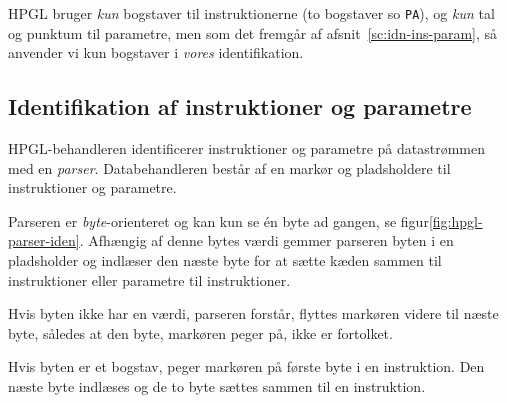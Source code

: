 HPGL bruger \textit{kun} bogstaver til instruktionerne (to bogstaver
so \texttt{PA}), og \textit{kun} tal og punktum til parametre, men som
det fremgår af afsnit~\vref{sc:idn-ins-param}, så anvender vi kun
bogstaver i \textit{vores} identifikation.  

\subsection{Identifikation af instruktioner og parametre}
\label{sc:idn-ins-param}


HPGL-behandleren identificerer instruktioner og parametre på
datastrømmen med en \textit{parser}. Databehandleren består af en
markør og pladsholdere til instruktioner og parametre.

Parseren er \textit{byte}-orienteret og kan kun se én byte ad gangen,
se figur\vref{fig:hpgl-parser-iden}. Afhængig af denne bytes værdi
gemmer parseren byten i en pladsholder og indlæser den næste byte for
at sætte kæden sammen til instruktioner eller parametre til
instruktioner.


Hvis byten ikke har en værdi, parseren forstår, flyttes markøren
videre til næste byte, således at den byte, markøren peger på, ikke er
fortolket.

Hvis byten er et bogstav, peger markøren på første byte i en
instruktion. Den næste byte indlæses og de to byte sættes sammen til
en instruktion.

